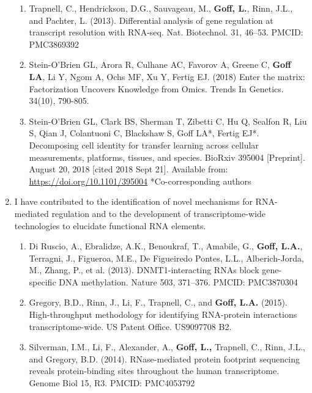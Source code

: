 \documentclass{nihbiosketch}
\begin{document}
\begin{enumerate}
\begin{enumerate}

\item	Trapnell, C., Hendrickson, D.G., Sauvageau, M., \textbf{Goff, L.}, Rinn, J.L., and Pachter, L. (2013). Differential analysis of gene regulation at transcript resolution with RNA-seq. Nat. Biotechnol. 31, 46–53. PMCID: PMC3869392

\item	Stein-O’Brien GL, Arora R, Culhane AC, Favorov A, Greene C, \textbf{Goff LA}, Li Y, Ngom A, Ochs MF, Xu Y, Fertig EJ. (2018) Enter the matrix: Factorization Uncovers Knowledge from Omics. Trends In Genetics. 34(10), 790-805. 

\item Stein-O’Brien GL, Clark BS, Sherman T, Zibetti C, Hu Q, Sealfon R, Liu S, Qian J, Colantuoni C, Blackshaw S, Goff LA*, Fertig EJ*. Decomposing cell identity for transfer learning across cellular measurements, platforms, tissues, and species. BioRxiv 395004 [Preprint]. August 20, 2018 [cited 2018 Sept 21]. Available from: \url{https://doi.org/10.1101/395004} *Co-corresponding authors

\end{enumerate}

\item I have contributed to the identification of novel mechanisms for RNA-mediated regulation and to the development of transcriptome-wide technologies to elucidate functional RNA elements.

\begin{enumerate}
\item	Di Ruscio, A., Ebralidze, A.K., Benoukraf, T., Amabile, G., \textbf{Goff, L.A.}, Terragni, J., Figueroa, M.E., De Figueiredo Pontes, L.L., Alberich-Jorda, M., Zhang, P., et al. (2013). DNMT1-interacting RNAs block gene-specific DNA methylation. Nature 503, 371–376. PMCID: PMC3870304

\item	Gregory, B.D., Rinn, J., Li, F., Trapnell, C., and \textbf{Goff, L.A.} (2015). High-throughput methodology for identifying RNA-protein interactions transcriptome-wide. US Patent Office. US9097708 B2.

\item	Silverman, I.M., Li, F., Alexander, A., \textbf{Goff, L.,} Trapnell, C., Rinn, J.L., and Gregory, B.D. (2014). RNase-mediated protein footprint sequencing reveals protein-binding sites throughout the human transcriptome. Genome Biol 15, R3. PMCID: PMC4053792


\end{enumerate}
\end{enumerate}
\end{document}
